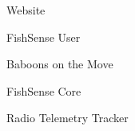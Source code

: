 \item Website
\item FishSense User
\item Baboons on the Move
\item FishSense Core
\item Radio Telemetry Tracker
